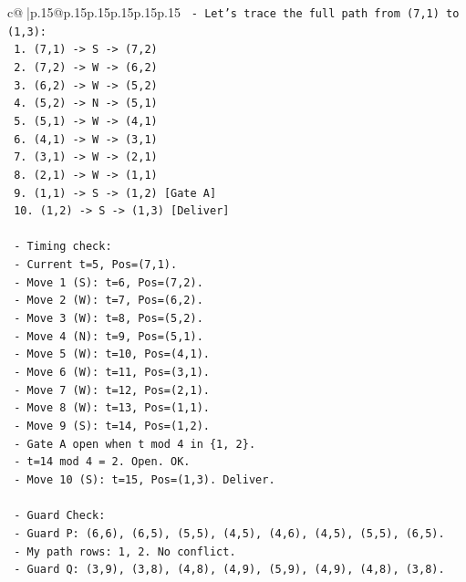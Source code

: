 \documentclass{article}
\begin{document}
{\begin{supertabular}{c@{$\;$}|p{.15\linewidth}@{}p{.15\linewidth}p{.15\linewidth}p{.15\linewidth}p{.15\linewidth}p{.15\linewidth}}
{{{\texttt{  {-} Let's trace the full path from (7,1) to (1,3):} \\
\texttt{    1. (7,1) {-}> S {-}> (7,2)} \\
\texttt{    2. (7,2) {-}> W {-}> (6,2)} \\
\texttt{    3. (6,2) {-}> W {-}> (5,2)} \\
\texttt{    4. (5,2) {-}> N {-}> (5,1)} \\
\texttt{    5. (5,1) {-}> W {-}> (4,1)} \\
\texttt{    6. (4,1) {-}> W {-}> (3,1)} \\
\texttt{    7. (3,1) {-}> W {-}> (2,1)} \\
\texttt{    8. (2,1) {-}> W {-}> (1,1)} \\
\texttt{    9. (1,1) {-}> S {-}> (1,2) {[}Gate A{]}} \\
\texttt{    10. (1,2) {-}> S {-}> (1,3) {[}Deliver{]}} \\
\\ 
\texttt{  {-} Timing check:} \\
\texttt{    {-} Current t=5, Pos=(7,1).} \\
\texttt{    {-} Move 1 (S): t=6, Pos=(7,2).} \\
\texttt{    {-} Move 2 (W): t=7, Pos=(6,2).} \\
\texttt{    {-} Move 3 (W): t=8, Pos=(5,2).} \\
\texttt{    {-} Move 4 (N): t=9, Pos=(5,1).} \\
\texttt{    {-} Move 5 (W): t=10, Pos=(4,1).} \\
\texttt{    {-} Move 6 (W): t=11, Pos=(3,1).} \\
\texttt{    {-} Move 7 (W): t=12, Pos=(2,1).} \\
\texttt{    {-} Move 8 (W): t=13, Pos=(1,1).} \\
\texttt{    {-} Move 9 (S): t=14, Pos=(1,2).} \\
\texttt{      {-} Gate A open when t mod 4 in \{1, 2\}.} \\
\texttt{      {-} t=14 mod 4 = 2. Open. OK.} \\
\texttt{    {-} Move 10 (S): t=15, Pos=(1,3). Deliver.} \\
\\ 
\texttt{  {-} Guard Check:} \\
\texttt{    {-} Guard P: (6,6), (6,5), (5,5), (4,5), (4,6), (4,5), (5,5), (6,5).} \\
\texttt{      {-} My path rows: 1, 2. No conflict.} \\
\texttt{    {-} Guard Q: (3,9), (3,8), (4,8), (4,9), (5,9), (4,9), (4,8), (3,8).} \\
}}}
\end{supertabular}}
\end{document}
